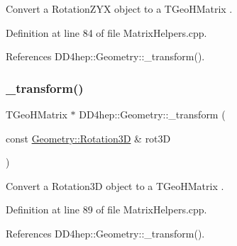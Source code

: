 Convert a Rotation\+Z\+YX object to a T\+Geo\+H\+Matrix . 



Definition at line 84 of file Matrix\+Helpers.\+cpp.



References D\+D4hep\+::\+Geometry\+::\+\_\+transform().

\hypertarget{group___d_d4_h_e_p___g_e_o_m_e_t_r_y_ga2b988c5fb8e427e757080009b3a4856f}{}\label{group___d_d4_h_e_p___g_e_o_m_e_t_r_y_ga2b988c5fb8e427e757080009b3a4856f} 
\subsubsection{\texorpdfstring{\+\_\+transform()}{\_transform()}\hspace{0.1cm}{\footnotesize\ttfamily [4/11]}}
{\footnotesize\ttfamily T\+Geo\+H\+Matrix $\ast$ D\+D4hep\+::\+Geometry\+::\+\_\+transform (\begin{DoxyParamCaption}\item[{const \hyperlink{namespace_d_d4hep_1_1_geometry_a022fecb763315fa2bf39cbb648944a0e}{Geometry\+::\+Rotation3D} \&}]{rot3D }\end{DoxyParamCaption})}



Convert a Rotation3D object to a T\+Geo\+H\+Matrix . 



Definition at line 89 of file Matrix\+Helpers.\+cpp.



References D\+D4hep\+::\+Geometry\+::\+\_\+transform().

\hypertarget{group___d_d4_h_e_p___g_e_o_m_e_t_r_y_gad6f7e93a5f8c5ae037658aa594d2f83b}{}\label{group___d_d4_h_e_p___g_e_o_m_e_t_r_y_gad6f7e93a5f8c5ae037658aa594d2f83b} 
